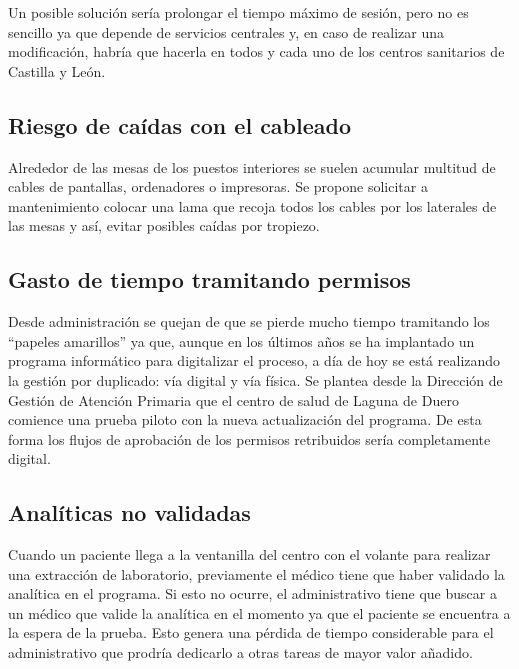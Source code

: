 Un posible solución sería prolongar el tiempo máximo de sesión, pero no es sencillo ya que depende de servicios centrales y, en caso de realizar una modificación, habría que hacerla en todos y cada uno de los centros sanitarios de Castilla y León.

\subsection{Riesgo de caídas con el cableado}

Alrededor de las mesas de los puestos interiores se suelen acumular multitud de cables de pantallas, ordenadores o impresoras.
Se propone solicitar a mantenimiento colocar una lama que recoja todos los cables por los laterales de las mesas y así, evitar posibles caídas por tropiezo.

\subsection{Gasto de tiempo tramitando permisos}

Desde administración se quejan de que se pierde mucho tiempo tramitando los ``papeles amarillos'' ya que, aunque en los últimos años se ha implantado un programa informático para digitalizar el proceso, a día de hoy se está realizando la gestión por duplicado: vía digital y vía física.
Se plantea desde la Dirección de Gestión de Atención Primaria que el centro de salud de Laguna de Duero comience una prueba piloto con la nueva actualización del programa.
De esta forma los flujos de aprobación de los permisos retribuidos sería completamente digital.

\subsection{Analíticas no validadas}

Cuando un paciente llega a la ventanilla del centro con el volante para realizar una extracción de laboratorio, previamente el médico tiene que haber validado la analítica en el programa.
Si esto no ocurre, el administrativo tiene que buscar a un médico que valide la analítica en el momento ya que el paciente se encuentra a la espera de la prueba.
Esto genera una pérdida de tiempo considerable para el administrativo que prodría dedicarlo a otras tareas de mayor valor añadido.